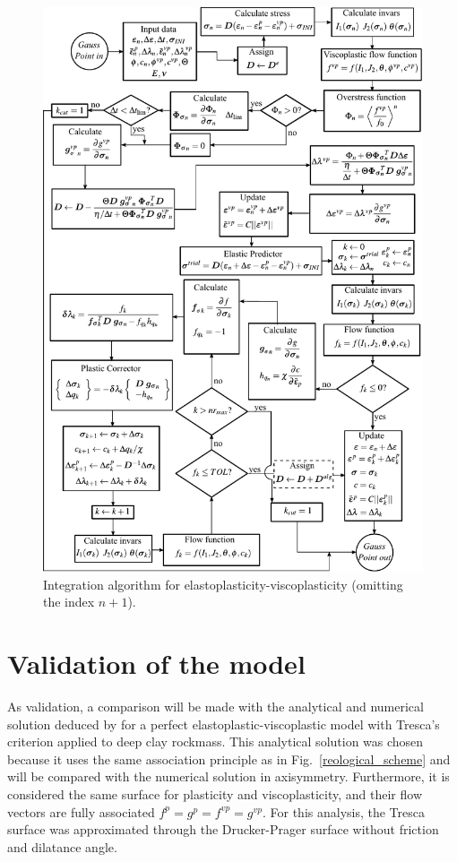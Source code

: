 \documentclass[Journal,letterpaper]{ascelike-new}
\begin{document}
\begin{figure}
	\centering
	\includegraphics[scale = 1.0]{integração EPVP.pdf}
	\caption{\label{integração EPVP}Integration algorithm for elastoplasticity-viscoplasticity (omitting the index $n+1$).}
\end{figure}

\section{Validation of the model}

As validation, a comparison will be made with the analytical and numerical solution deduced by \cite{piepi1995} for a perfect elastoplastic-viscoplastic model with Tresca’s criterion applied to deep clay rockmass. This analytical solution was chosen because it uses the same association principle as in Fig.~\ref{reological_scheme} and will be compared with the numerical solution in axisymmetry. Furthermore, it is considered the same surface for plasticity and viscoplasticity, and their flow vectors are fully associated  $f^p = g^{p} = f^{vp} = g^{vp}$. For this analysis, the Tresca surface was approximated through the Drucker-Prager surface without friction and dilatance angle.
\end{document}
